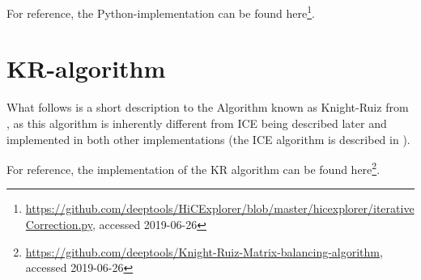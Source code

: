 For reference, the Python-implementation can be found
here\footnote{\url{https://github.com/deeptools/HiCExplorer/blob/master/hicexplorer/iterativeCorrection.py},
accessed 2019-06-26}.




\section{KR-algorithm}\label{sec:KR}


What follows is a short description to the Algorithm known as Knight-Ruiz from
\cite{knight2013fast}, as this algorithm is inherently different from ICE being
described later and implemented in both other implementations
(the ICE algorithm is described in ).






For reference, the implementation of the KR algorithm can be found here\footnote{\url{https://github.com/deeptools/Knight-Ruiz-Matrix-balancing-algorithm}, accessed 2019-06-26}.











